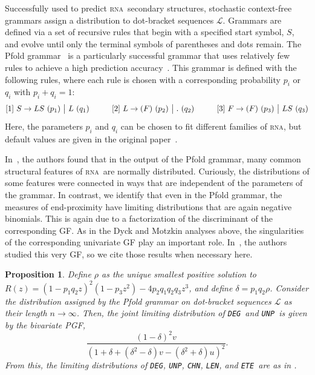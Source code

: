 \documentclass{article}
\newtheorem{proposition}[theorem]{Proposition}
\newcommand{\RNA}{\textsc{rna}}
\newcommand{\rna}{\textsc{rna}}
\newcommand{\DEG}{{\tt DEG}}
\newcommand{\UNP}{{\tt UNP}}
\newcommand{\ETE}{{\tt ETE}}
\newcommand{\COV}{{\tt CHN}}
\newcommand{\LEN}{{\tt LEN}}
\begin{document}
Successfully used to predict \rna\ secondary structures, stochastic context-free grammars assign a distribution to dot-bracket sequences $\mathcal{L}$.  Grammars are defined via a set of recursive rules that begin with a specified start symbol, $S$, and evolve until only the terminal symbols of parentheses and dots remain.  The Pfold grammar~\cite{Knudsen:2003} is a particularly successful grammar that uses relatively few rules to achieve a high prediction accuracy~\cite{Dowell:2004}.  This grammar is defined with the following rules, where each rule is chosen with a corresponding probability $p_i$ or $q_i$ with $p_i + q_i = 1$:
\[
[1]\ S \to LS\ (p_1)\ \big|\ L\ (q_1) \hspace{.4 in}[2]\ L \to (F) \ (p_2)\ \big| \ . \ (q_2) \hspace{.4 in} [3]\ F \to (F)\ (p_3) \ \big|\ LS\ (q_3)
\]
Here, the parameters $p_i$ and $q_i$ can be chosen to fit different families of \RNA, but default values are given in the original paper~\cite{Knudsen:2003}.

In~\cite{Poznanovic:2014}, the authors found that in the output of the Pfold grammar, many common structural features of \RNA\ are normally distributed.  Curiously, the distributions of some features were connected in ways that are independent of the parameters of the grammar.  In contrast, we identify that even in the Pfold grammar, the measures of end-proximity have limiting distributions that are again negative binomials.  This is again due to a factorization of the discriminant of the corresponding GF.  As in the Dyck and Motzkin analyses above, the singularities of the corresponding univariate GF play an important role.  In~\cite{Poznanovic:2014}, the authors studied this very GF, so we cite those results when necessary here.  

\begin{proposition}
\label{prop:Pfold}
    Define $\rho$ as the unique smallest positive solution to $R(z) = (1 - p_1q_2z)^2(1-p_3z^2) - 4p_2q_1q_2q_3z^3$, and define $\delta = p_1q_2\rho$.  Consider the distribution assigned by the Pfold grammar on dot-bracket sequences $\mathcal{L}$ as their length $n \to \infty$.  Then, the joint limiting distribution of \DEG\ and \UNP\ is given by the bivariate PGF,
    \[
    \frac{(1-\delta)^2v}{(1 + \delta + (\delta^2 - \delta)v - (\delta^2 + \delta)u)^2}.
    \]
    From this, the limiting distributions of \DEG, \UNP, \COV, \LEN, and \ETE\ are as in .
\end{proposition}
\end{document}
